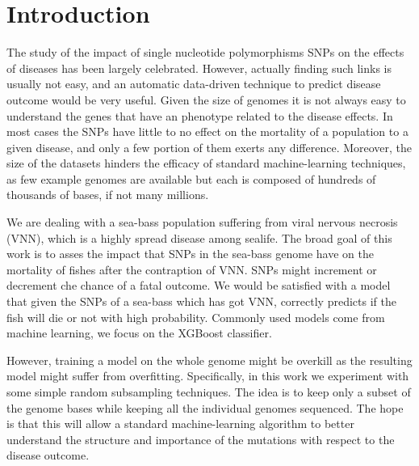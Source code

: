 \section{Introduction}
\label{sec:intro}
The study of the impact of single nucleotide polymorphisms SNPs on the effects of diseases has been largely celebrated. 
However, actually finding such links is usually not easy, and an automatic data-driven technique to predict disease outcome would be very useful.
Given the size of genomes it is not always easy to understand the genes that have an phenotype related to the disease effects.
In most cases the SNPs have little to no effect on the mortality of a population to a given disease, and only a few portion of them exerts any difference.
Moreover, the size of the datasets hinders the efficacy of standard machine-learning techniques, as few example genomes are available but each is composed of hundreds of thousands of bases, if not many millions.

We are dealing with a sea-bass population suffering from viral nervous necrosis (VNN), which is a highly spread disease among sealife.
The broad goal of this work is to asses the impact that SNPs in the sea-bass genome have on the mortality of fishes after the contraption of VNN.
SNPs might increment or decrement che chance of a fatal outcome. 
We would be satisfied with a model that given the SNPs of a sea-bass which has got VNN, correctly predicts if the fish will die or not with high probability.
Commonly used models come from machine learning, we focus on the XGBoost classifier.

However, training a model on the whole genome might be overkill as the resulting model might suffer from overfitting.
Specifically, in this work we experiment with some simple random subsampling techniques.
The idea is to keep only a subset of the genome bases while keeping all the individual genomes sequenced.
The hope is that this will allow a standard machine-learning algorithm to better understand the structure and importance of the mutations with respect to the disease outcome.

